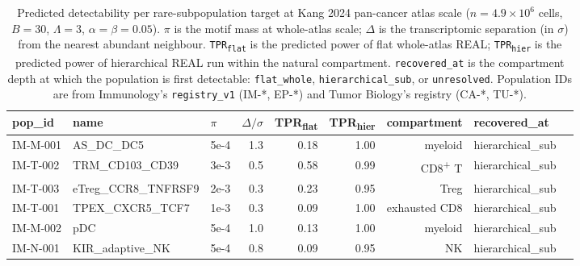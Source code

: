 
\begin{table}[h]
\centering
\caption{Predicted detectability per rare-subpopulation target at Kang 2024 pan-cancer atlas scale ($n = 4.9\times 10^{6}$ cells, $B=30$, $\Lambda=3$, $\alpha=\beta=0.05$). $\pi$ is the motif mass at whole-atlas scale; $\Delta$ is the transcriptomic separation (in $\sigma$) from the nearest abundant neighbour. \texttt{TPR\textsubscript{flat}} is the predicted power of flat whole-atlas REAL; \texttt{TPR\textsubscript{hier}} is the predicted power of hierarchical REAL run within the natural compartment. \texttt{recovered\_at} is the compartment depth at which the population is first detectable: \texttt{flat\_whole}, \texttt{hierarchical\_sub}, or \texttt{unresolved}. Population IDs are from Immunology's \texttt{registry\_v1} (IM-*, EP-*) and Tumor Biology's registry (CA-*, TU-*).}
\label{tab:S1-detectability-per-pop}
\small
\renewcommand{\arraystretch}{1.15}
\begin{tabular}{lllrrrrll}
\toprule
\textbf{pop\_id} & \textbf{name} & \textbf{$\pi$} & \textbf{$\Delta/\sigma$} & \textbf{TPR\textsubscript{flat}} & \textbf{TPR\textsubscript{hier}} & \textbf{compartment} & \textbf{recovered\_at} \\
\midrule
IM-M-001 & AS\_DC\_DC5              & 5e-4 & 1.3 & 0.18 & 1.00 & myeloid          & hierarchical\_sub \\
IM-T-002 & TRM\_CD103\_CD39         & 3e-3 & 0.5 & 0.58 & 0.99 & CD8\textsuperscript{+} T & hierarchical\_sub \\
IM-T-003 & eTreg\_CCR8\_TNFRSF9     & 2e-3 & 0.3 & 0.23 & 0.95 & Treg             & hierarchical\_sub \\
IM-T-001 & TPEX\_CXCR5\_TCF7        & 1e-3 & 0.3 & 0.09 & 1.00 & exhausted CD8    & hierarchical\_sub \\
IM-M-002 & pDC                      & 5e-4 & 1.0 & 0.13 & 1.00 & myeloid          & hierarchical\_sub \\
IM-N-001 & KIR\_adaptive\_NK        & 5e-4 & 0.8 & 0.09 & 0.95 & NK               & hierarchical\_sub \\

\end{tabular}
\end{table}
